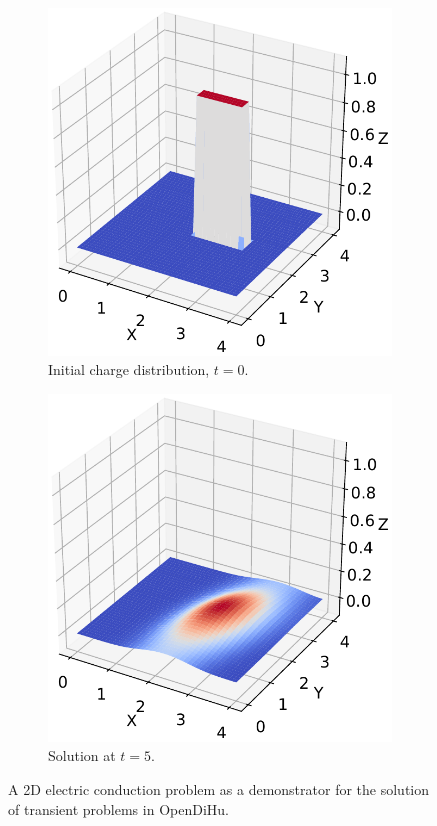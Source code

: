\begin{figure}
  \centering%
  \begin{subfigure}[t]{0.4\textwidth}%
    \centering%
    \includegraphics[width=\textwidth]{images/results/basic/diffusion1.pdf}%
    \caption{Initial charge distribution, $t=0$.}%
    \label{fig:diffusion1}%
  \end{subfigure}\quad
  \begin{subfigure}[t]{0.4\textwidth}%
    \centering%
    \includegraphics[width=\textwidth]{images/results/basic/diffusion2.pdf}%
    \caption{Solution at $t=5$.}%
    \label{fig:diffusion2}%
  \end{subfigure}
  \caption{A 2D electric conduction problem as a demonstrator for the solution of transient problems in OpenDiHu.}%
  \label{fig:diffusion}%
\end{figure}%


